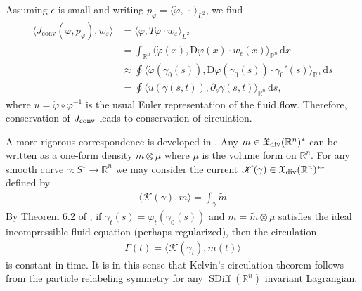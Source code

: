 \documentclass[12pt]{amsart}
\newcommand{\hoj}[1]{\todo[inline,color=blue!20]{HOJ: #1}}
\newcommand{\dm}[1]{\todo[inline,color=yellow!20]{DM:  #1}}
\newcommand{\R}{\ensuremath{\mathbb{R}}}
\DeclareMathOperator{\SDiff}{SDiff}
\begin{document}
Assuming $\epsilon$ is small and writing 
$p_\varphi = \langle \dot{\varphi} , \,\cdot\, \rangle_{L^2}$, we find
\begin{align*}
  \langle J_\text{conv}(\varphi,p_\varphi) , w_\varepsilon \rangle
  &= \langle \dot{\varphi} , T\varphi \cdot w_\varepsilon \rangle_{L^2}\\
  &= \int_{\mathbb{R}^n} \langle \dot{\varphi}(x) , \textrm{D}\varphi(x)\cdot w_\epsilon(x) \rangle_{\mathbb{R}^n} \,\textrm{d} x \\
  &\approx \oint \langle \dot{\varphi}(\gamma_0(s)) , \textrm{D}\varphi(\gamma_0(s))\cdot \gamma_0'(s) \rangle_{\mathbb{R}^n} \,\textrm{d} s \\
  &= \oint \langle u(\gamma(s,t)) , \partial_s \gamma(s,t) \rangle_{\mathbb{R}^n} \,\textrm{d} s,
\end{align*}
where $u = \dot{\varphi}\circ\varphi^{-1}$ is the usual Euler
representation of the fluid flow. 
Therefore, conservation of $J_{\rm conv}$ leads to conservation of circulation.

A more rigorous correspondence is developed in \cite{HolmMarsdenRatiu1998}.
Any $m \in \mathfrak{X}_{\rm div}(\R^n)^*$ can be written as a one-form density $\tilde{m} \otimes \mu$
where $\mu$ is the volume form on $\R^n$.
For any smooth curve $\gamma:S^1 \to \R^n$ we may consider the current
$\mathscr{K}(\gamma) \in \mathfrak{X}_{\rm div}(\R^n)^{**}$ defined by
\begin{align*}
	\langle \mathscr{K}(\gamma) , m \rangle = \int_{\gamma} \tilde{m}
\end{align*}
By Theorem 6.2 of \cite{HolmMarsdenRatiu1998}, if $\gamma_t(s) = \varphi_t(\gamma_0(s))$ and $m = \tilde{m} \otimes \mu$ satisfies
the ideal incompressible fluid equation (perhaps regularized), then the circulation
\begin{align*}
	\Gamma(t) = \langle \mathscr{K}(\gamma_t) , m(t) \rangle
\end{align*}
is constant in time.
It is in this sense that Kelvin's circulation theorem follows from the particle
relabeling symmetry for any $\SDiff(\R^n)$ invariant Lagrangian. 
\end{document}
